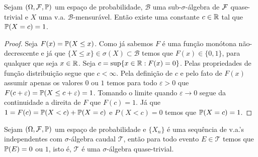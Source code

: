 \begin{lema}
\label{lema-sigma-algebras-quase-triviais}
Sejam $(\Omega,\F,\P)$ um espaço de probabilidade,
$\mathcal{B}$ uma sub-$\sigma$-álgebra de $\F$
quase-trivial e $X$ uma v.a. $\mathcal{B}$-mensurável.
Então existe uma constante $c\in\R$ tal que 
$\P(X=c)=1$.
\end{lema}



\begin{proof}
Seja $F(x)=\P(X\leq x)$. Como já sabemos $F$ é uma 
função monótona não-decrescente e já que 
$\{X\leq x\}\in\sigma(X)\subset \mathcal{B}$ 
temos que $F(x)\in\{0,1\}$, para qualquer 
que seja $x\in\R$. Seja $c =\sup\{x\in\R: F(x)=0\}$.
Pelas propriedades de função distribuição segue que 
$c<\infty$. Pela definição de $c$ e pelo fato de 
$F(x)$ assumir apenas os valores $0$ ou $1$
temos para todo $\varepsilon>0$ que
$F(c+\varepsilon)=\P(X\leq c+\varepsilon)=1$.
Tomando o limite quando $\varepsilon\to 0$ segue da 
continuidade a direita de $F$ que $F(c)=1$.
Já que $1=F(c)= \P(X<c)+\P(X=c)$ e $P(X<c)=0$
temos que $\P(X=c)=1$.
\end{proof}















\begin{teorema}
\label{teo-lei-zero-um-kolmogorov}
Sejam $(\Omega,\F,\P)$ um espaço de probabilidade
e $\{X_n\}$ é uma sequência de v.a.'s independentes
com $\sigma$-álgebra caudal $\mathcal{T}$, então 
para todo evento $E\in\mathcal{T}$ temos que 
$\P(E)=0$ ou $1$, isto é, $\mathcal{T}$ 
é uma $\sigma$-álgebra quase-trivial.
\end{teorema}


